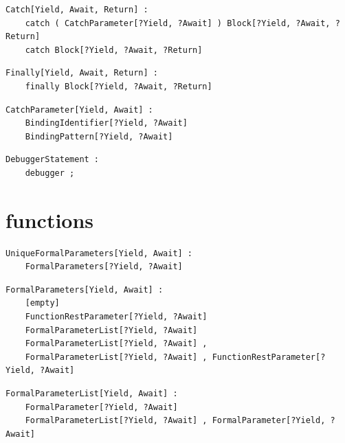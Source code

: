 \noindent\textbf{\texttt{}}\par
\begin{lstlisting}
Catch[Yield, Await, Return] :
    catch ( CatchParameter[?Yield, ?Await] ) Block[?Yield, ?Await, ?Return]
    catch Block[?Yield, ?Await, ?Return]
\end{lstlisting}

\noindent\textbf{\texttt{}}\par
\begin{lstlisting}
Finally[Yield, Await, Return] :
    finally Block[?Yield, ?Await, ?Return]
\end{lstlisting}

\noindent\textbf{\texttt{}}\par
\begin{lstlisting}
CatchParameter[Yield, Await] :
    BindingIdentifier[?Yield, ?Await]
    BindingPattern[?Yield, ?Await]
\end{lstlisting}

\noindent\textbf{\texttt{}}\par
\begin{lstlisting}
DebuggerStatement :
    debugger ;
\end{lstlisting}

\section{functions}

\noindent\textbf{\texttt{}}\par
\begin{lstlisting}
UniqueFormalParameters[Yield, Await] :
    FormalParameters[?Yield, ?Await]
\end{lstlisting}

\noindent\textbf{\texttt{}}\par
\begin{lstlisting}
FormalParameters[Yield, Await] :
    [empty]
    FunctionRestParameter[?Yield, ?Await]
    FormalParameterList[?Yield, ?Await]
    FormalParameterList[?Yield, ?Await] ,
    FormalParameterList[?Yield, ?Await] , FunctionRestParameter[?Yield, ?Await]
\end{lstlisting}

\noindent\textbf{\texttt{}}\par
\begin{lstlisting}
FormalParameterList[Yield, Await] :
    FormalParameter[?Yield, ?Await]
    FormalParameterList[?Yield, ?Await] , FormalParameter[?Yield, ?Await]
\end{lstlisting}

